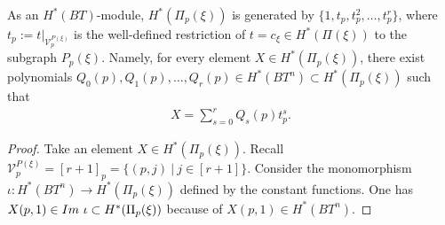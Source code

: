 \documentclass[10pt,a4paper]{amsart}
\begin{document}
\begin{lemma}
\label{technical_lemm}
As an $H^{*}(BT)$-module, $H^{*}(\Pi_{p}(\xi))$ is generated by $\{1, t_{p},t_{p}^{2},\ldots, t_{p}^{r}\}$, where  $t_{p}:=t|_{\mathcal{V}_{p}^{P(\xi)}}$ is the well-defined restriction of $t=c_{\xi}\in H^{*}(\Pi(\xi))$ to the subgraph $P_{p}(\xi)$.
Namely, for every element $X\in H^{*}(\Pi_{p}(\xi))$, there exist polynomials $Q_{0}(p),Q_{1}(p),\ldots, Q_{r}(p)\in H^{*}(BT^{n})\subset H^{*}(\Pi_{p}(\xi))$ such that
\begin{align}\label{eq:module_dec}
X=\sum_{s=0}^{r}Q_{s}(p)t_{p}^{s}.
\end{align}
\end{lemma}

\begin{proof}
Take an element $X\in H^{*}(\Pi_{p}(\xi))$.
Recall $\mathcal{V}_{p}^{P(\xi)}=[r+1]_{p}=\{(p,j)\ |\ j\in [r+1]\}$.
Consider the monomorphism $\iota\colon H^{*}(BT^{n})\to H^{*}(\Pi_{p}(\xi))$ defined by the constant functions.
One has  $X(p,1)\in {\rm Im}~\iota\subset H^{*}(\Pi_{p}(\xi))$ because of $X(p,1)\in H^{*}(BT^{n})$.


\end{proof}
\end{document}
